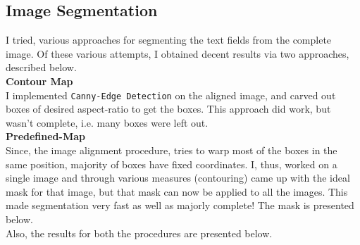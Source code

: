 \documentclass{article}
\begin{document}
    \subsection*{Image Segmentation}
    I tried, various approaches for segmenting the text fields from the complete image. Of these various attempts, I obtained decent results via two approaches, described below.\\
    \textbf{Contour Map}\\
    I implemented \texttt{Canny-Edge Detection} on the aligned image, and carved out boxes of desired aspect-ratio to get the boxes. This approach did work, but wasn't complete, i.e. many boxes were left out.\\
    \textbf{Predefined-Map}\\
    Since, the image alignment procedure, tries to warp most of the boxes in the same position, majority of boxes have fixed coordinates. I, thus, worked on a single image and through various measures (contouring) came up with the ideal mask for that image, but that mask can now be applied to all the images. This made segmentation very fast as well as majorly complete! The mask is presented below.\\
    Also, the results for both the procedures are presented below.
    
\end{document}
